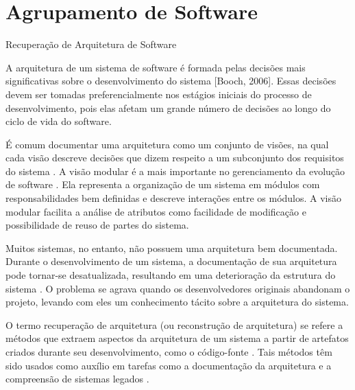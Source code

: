 %
% 

\chapter{Agrupamento de Software} \label{cap:agrupamento}


\begin{section}{Recuperação de Arquitetura de Software}

A arquitetura de um sistema de software é formada pelas decisões mais significativas sobre o desenvolvimento do sistema [Booch, 2006]. Essas decisões devem ser tomadas preferencialmente nos estágios iniciais do processo de desenvolvimento, pois elas afetam um grande número de decisões ao longo do ciclo de vida do software.

É comum documentar uma arquitetura como um conjunto de visões, na qual cada visão descreve decisões que dizem respeito a um subconjunto dos requisitos do sistema \cite{Clements2002}. A visão modular é a mais importante no gerenciamento da evolução de software \cite{Parnas1972}. Ela representa a organização de um sistema em módulos com responsabilidades bem definidas e descreve interações entre os módulos. A visão modular facilita a análise de atributos como facilidade de modificação e possibilidade de reuso de partes do sistema.

Muitos sistemas, no entanto, não possuem uma arquitetura bem documentada. Durante o desenvolvimento de um sistema, a documentação de sua arquitetura pode tornar-se desatualizada, resultando em uma deterioração da estrutura do sistema \cite{Eick2001,Parnas1994}. O problema se agrava quando os desenvolvedores originais abandonam o projeto, levando com eles um conhecimento tácito sobre a arquitetura do sistema.

O termo recuperação de arquitetura (ou reconstrução de arquitetura) se refere a métodos que extraem aspectos da arquitetura de um sistema a partir de artefatos criados durante seu desenvolvimento, como o código-fonte \cite{Pollet2007}. Tais métodos têm sido usados como auxílio em tarefas como a documentação da arquitetura e a compreensão de sistemas legados \cite{Wu2005}.


\end{section}
